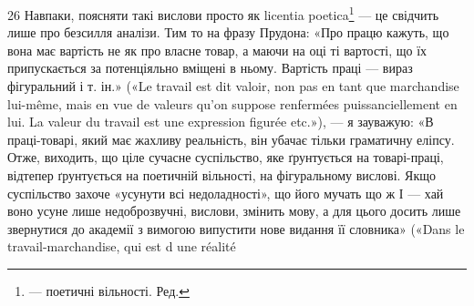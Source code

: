 26 Навпаки, поясняти такі вислови просто як licentia poetica\footnote*{
— поетичні вільності. Ред.
} — це
свідчить лише про безсилля аналізи. Тим то на фразу Прудона: «Про
працю кажуть, що вона має вартість не як про власне товар, а маючи
на оці ті вартості, що їх припускається за потенціяльно вміщені в ньому.
Вартість праці — вираз фігуральний і т. ін.» («Le travail est dit valoir,
non pas en tant que marchandise lui-même, mais en vue de valeurs qu’on
suppose renfermées puissanciellement en lui. La valeur du travail est une
expression figurée etc.»), — я зауважую: «В праці-товарі, який має
жахливу реальність, він убачає тільки граматичну еліпсу. Отже,
виходить, що ціле сучасне суспільство, яке ґрунтується на товарі-праці,
відтепер ґрунтується на поетичній вільності, на фігуральному вислові.
Якщо суспільство захоче «усунути всі недоладності», що його мучать
що ж І — хай воно усуне лише недоброзвучні, вислови, змінить мову, а для
цього досить лише звернутися до академії з вимогою випустити нове
видання її словника» («Dans le travail-marchandise, qui est d une réalité